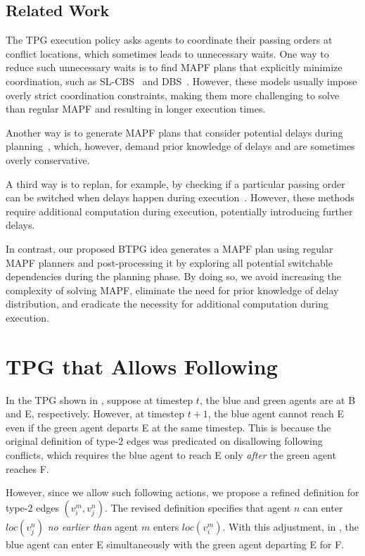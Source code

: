 \documentclass[letterpaper]{article}
\theoremstyle{definition}
\begin{document}
\subsection{Related Work}

The TPG execution policy asks agents to coordinate their passing orders at conflict locations, which sometimes leads to unnecessary waits.
One way to reduce such unnecessary waits is to find MAPF plans that explicitly minimize coordination, such as SL-CBS~\cite{wagner_minimizing_2022} and DBS~\cite{okumura_offline_2023}. However, these models usually impose overly strict coordination constraints, making them more challenging to solve than regular MAPF and resulting in longer execution times.

Another way is to generate MAPF plans that consider potential delays during planning~\cite{ma_multi-agent_2017, atzmon_robust_2021}, which, however, demand prior knowledge of delays and are sometimes overly conservative.

A third way is to replan, for example, by checking if a particular passing order can be switched when delays happen during execution~\cite{berndt_feedback_2020,paul_fast_2023,pecora_loosely-coupled_2018,coskun_deadlock-free_2021}. However, these methods require additional computation during execution, potentially introducing further delays.

In contrast, our proposed BTPG idea generates a MAPF plan using regular MAPF planners and post-processing it by exploring all potential switchable dependencies during the planning phase. By doing so, we avoid increasing the complexity of solving MAPF, eliminate the need for prior knowledge of delay distribution, and eradicate the necessity for additional computation during execution.





\section{TPG that Allows Following}
In the TPG shown in , suppose at timestep $t$, the blue and green agents are at B and E, respectively. However, at timestep $t+1$, the blue agent cannot reach E even if the green agent departs E at the same timestep. This is because the original definition of type-2 edges was predicated on disallowing following conflicts, which requires the blue agent to reach E only \emph{after} the green agent reaches F.

However, since we allow such following actions, we propose a refined definition for type-2 edges $(v_i^m, v_j^n)$. The revised definition specifies that agent $n$ can enter $loc(v_{j}^n)$ \emph{no earlier than} agent $m$ enters $loc(v_{i}^m)$.
With this adjustment, in , the blue agent can enter E simultaneously with the green agent departing E for F.
\end{document}
